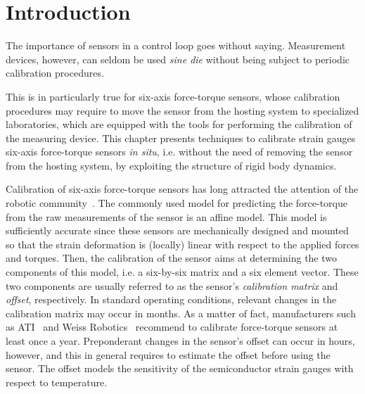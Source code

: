 \section{Introduction}

The importance of sensors in a control loop goes without saying.
Measurement devices, however, can seldom be used \emph{sine die} without being subject to periodic calibration procedures.

This is in particularly true for six-axis force-torque sensors, whose calibration procedures may require to move the sensor from the hosting system to specialized laboratories, which are equipped with
the tools for performing the calibration of the measuring device. This chapter presents techniques to calibrate 
strain gauges six-axis force-torque sensors \emph{in situ}, i.e. without the need of removing the sensor from the hosting system, by exploiting the structure of rigid body dynamics. 

Calibration of six-axis force-torque sensors  has long attracted the attention of the robotic community~\citep{braun2011}. 
The commonly used model for predicting the force-torque 
from the raw measurements of the sensor is an affine model.
This model is sufficiently accurate 
since these sensors are mechanically designed and mounted so that the strain deformation is (locally) linear with respect to the applied forces and torques.
Then, the calibration of the sensor aims at determining the two components of this model, i.e. a six-by-six matrix and a six element vector.
These two components are usually referred to as the sensor's \emph{calibration matrix} and \emph{offset}, respectively.
In standard operating conditions, relevant changes in the calibration matrix may occur in months.
As a matter of fact, manufacturers such as ATI~\citep{atimanual} and Weiss Robotics~\citep{kms40manual} 
recommend to calibrate force-torque sensors at least once a year.
Preponderant changes in the sensor's offset can occur in hours, however, and this in general requires to estimate the 
offset before using the  sensor.
The offset models the sensitivity of the semiconductor strain gauges with respect to temperature.

